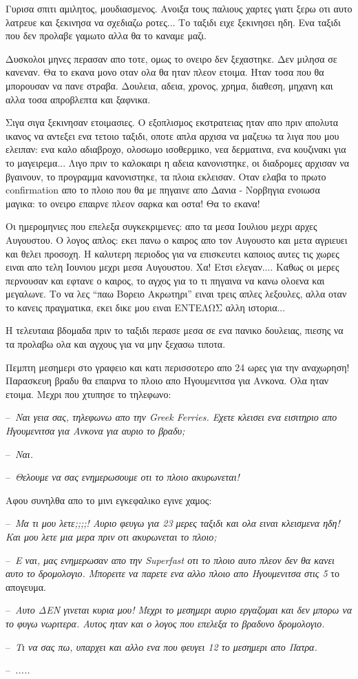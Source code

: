 \documentclass[]{book}
\newcommand\dialogue[1]{\par\noindent--~\textit{#1}}
\begin{document}
Γυρισα σπιτι αμιλητος, μουδιασμενος. Ανοιξα τους παλιους χαρτες γιατι ξερω οτι αυτο λατρευε και ξεκινησα να σχεδιαζω ροτες... Το ταξιδι ειχε ξεκινησει ηδη. Ενα ταξιδι που δεν προλαβε γαμωτο αλλα θα το καναμε μαζι.

Δυσκολοι μηνες περασαν απο τοτε, ομως το ονειρο δεν ξεχαστηκε. Δεν μιλησα σε κανεναν. Θα το εκανα μονο οταν ολα θα ηταν πλεον ετοιμα. Ηταν τοσα που θα μπορουσαν να πανε στραβα. Δουλεια, αδεια, χρονος, χρημα, διαθεση, μηχανη και αλλα τοσα απροβλεπτα και ξαφνικα.

Σιγα σιγα ξεκινησαν ετοιμασιες. Ο εξοπλισμος εκστρατειας ηταν απο πριν απολυτα ικανος να αντεξει ενα τετοιο ταξιδι, οποτε απλα αρχισα να μαζευω τα λιγα που μου ελειπαν: ενα καλο αδιαβροχο, ολοσωμο ισοθερμικο, νεα δερματινα, ενα κουζινακι για το μαγειρεμα... Λιγο πριν το καλοκαιρι η αδεια κανονιστηκε, οι διαδρομες αρχισαν να βγαινουν, το προγραμμα κανονιστηκε, τα πλοια εκλεισαν. Οταν ελαβα το πρωτο confirmation απο το πλοιο που θα με πηγαινε απο Δανια - Νορβηγια ενοιωσα μαγικα: το ονειρο επαιρνε πλεον σαρκα και οστα! Θα το εκανα!

Οι ημερομηνιες που επελεξα συγκεκριμενες: απο τα μεσα Ιουλιου μεχρι αρχες Αυγουστου. Ο λογος απλος: εκει πανω ο καιρος απο τον Αυγουστο και μετα αγριευει και θελει προσοχη. Η καλυτερη περιοδος για να επισκευτει καποιος αυτες τις χωρες ειναι απο τελη Ιουνιου μεχρι μεσα Αυγουστου. Χα! Ετσι ελεγαν.... Καθως οι μερες περνουσαν και εφτανε ο καιρος, το αγχος για το τι πηγαινα να κανω ολοενα και μεγαλωνε. Το να λες ``παω Βορειο Ακρωτηρι'' ειναι τρεις απλες λεξουλες, αλλα οταν το κανεις πραγματικα, εκει δικε μου ειναι ΕΝΤΕΛΩΣ αλλη ιστορια...

Η τελευταια βδομαδα πριν το ταξιδι περασε μεσα σε ενα πανικο δουλειας, πιεσης να τα προλαβω ολα και αγχους για να μην ξεχασω τιποτα.

Πεμπτη μεσημερι στο γραφειο και κατι περισσοτερο απο 24 ωρες για την αναχωρηση! Παρασκευη βραδυ θα επαιρνα το πλοιο απο Ηγουμενιτσα για Ανκονα. Ολα ηταν ετοιμα. Μεχρι που χτυπησε το τηλεφωνο:

\dialogue{Ναι γεια σας, τηλεφωνω απο την Greek Ferries. Eχετε κλεισει ενα εισιτηριο απο Ηγουμενιτσα για Ανκονα για αυριο το βραδυ;}
\dialogue{Ναι.}
\dialogue{Θελουμε να σας ενημερωσουμε οτι το πλοιο ακυρωνεται!}

Αφου συνηλθα απο το μινι εγκεφαλικο εγινε χαμος:

\dialogue{Μα τι μου λετε;;;;! Αυριο φευγω για 23 μερες ταξιδι και ολα ειναι κλεισμενα ηδη! Και μου λετε μια μερα πριν οτι ακυρωνεται το πλοιο;}
\dialogue{Ε ναι, μας ενημερωσαν απο την Superfast οτι το πλοιο αυτο πλεον δεν θα κανει αυτο το δρομολογιο. Μπορειτε να παρετε ενα αλλο πλοιο απο Ηγουμενιτσα στις 5 }το απογευμα.
\dialogue{Αυτο ΔΕΝ γινεται κυρια μου! Μεχρι το μεσημερι αυριο εργαζομαι και δεν μπορω να το φυγω νωριτερα. Αυτος ηταν και ο λογος που επελεξα το βραδυνο δρομολογιο.}
\dialogue{Τι να σας πω, υπαρχει και αλλο ενα που φευγει 12 το μεσημερι απο Πατρα.}
\dialogue{.....}
\end{document}
